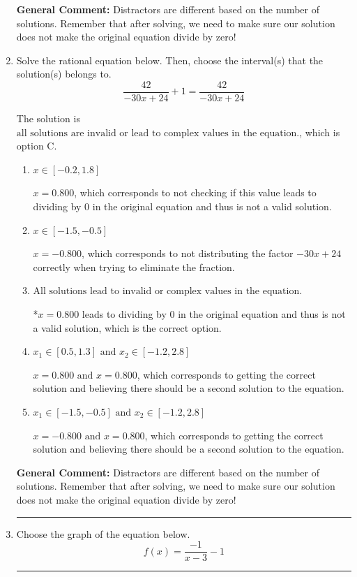 \documentclass{extbook}[14pt]
\newcommand{\litem}[1]{\item #1

\rule{\textwidth}{0.4pt}}
\begin{document}
\begin{enumerate}
{\textbf{General Comment:} Distractors are different based on the number of solutions. Remember that after solving, we need to make sure our solution does not make the original equation divide by zero!
}
\litem{
Solve the rational equation below. Then, choose the interval(s) that the solution(s) belongs to.
\[ \frac{42}{-30x + 24} + 1 = \frac{42}{-30x + 24} \]

The solution is \( \text{all solutions are invalid or lead to complex values in the equation.} \), which is option C.\begin{enumerate}[label=\Alph*.]
\item \( x \in [-0.2,1.8] \)

$x = 0.800$, which corresponds to not checking if this value leads to dividing by 0 in the original equation and thus is not a valid solution.
\item \( x \in [-1.5,-0.5] \)

$x = -0.800$, which corresponds to not distributing the factor $-30x + 24$ correctly when trying to eliminate the fraction.
\item \( \text{All solutions lead to invalid or complex values in the equation.} \)

*$x = 0.800$ leads to dividing by 0 in the original equation and thus is not a valid solution, which is the correct option.
\item \( x_1 \in [0.5, 1.3] \text{ and } x_2 \in [-1.2,2.8] \)

$x = 0.800 \text{ and } x = 0.800$, which corresponds to getting the correct solution and believing there should be a second solution to the equation.
\item \( x_1 \in [-1.5, -0.5] \text{ and } x_2 \in [-1.2,2.8] \)

$x = -0.800 \text{ and } x = 0.800$, which corresponds to getting the correct solution and believing there should be a second solution to the equation.
\end{enumerate}

\textbf{General Comment:} Distractors are different based on the number of solutions. Remember that after solving, we need to make sure our solution does not make the original equation divide by zero!
}
\litem{
Choose the graph of the equation below.
\[ f(x) = \frac{-1}{x - 3} - 1 \]

}
\end{enumerate}
\end{document}
